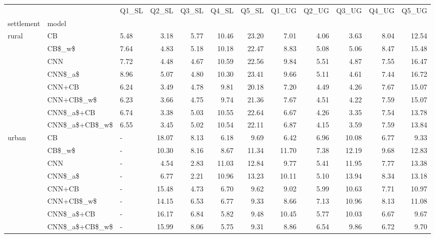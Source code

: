 \begin{tabular}{lllrrrrrrrrr}
\toprule
      &                & Q1\_SL &  Q2\_SL &  Q3\_SL &  Q4\_SL &  Q5\_SL &  Q1\_UG &  Q2\_UG &  Q3\_UG &  Q4\_UG &  Q5\_UG \\
settlement & model &       &        &        &        &        &        &        &        &        &        \\
\midrule
rural & CB &  5.48 &   3.18 &   5.77 &  10.46 &  23.20 &   7.01 &   4.06 &   3.63 &   8.04 &  12.54 \\
      & CB\$\_w\$ &  7.64 &   4.83 &   5.18 &  10.18 &  22.47 &   8.83 &   5.08 &   5.06 &   8.47 &  15.48 \\
      & CNN &  7.72 &   4.48 &   4.67 &  10.59 &  22.56 &   9.84 &   5.51 &   4.87 &   7.55 &  16.47 \\
      & CNN\$\_a\$ &  8.96 &   5.07 &   4.80 &  10.30 &  23.41 &   9.66 &   5.11 &   4.61 &   7.44 &  16.72 \\
      & CNN+CB &  6.24 &   3.49 &   4.78 &   9.81 &  20.18 &   7.20 &   4.49 &   4.26 &   7.67 &  15.07 \\
      & CNN+CB\$\_w\$ &  6.23 &   3.66 &   4.75 &   9.74 &  21.36 &   7.67 &   4.51 &   4.22 &   7.59 &  15.07 \\
      & CNN\$\_a\$+CB &  6.74 &   3.38 &   5.03 &  10.55 &  22.64 &   6.67 &   4.26 &   3.35 &   7.54 &  13.78 \\
      & CNN\$\_a\$+CB\$\_w\$ &  6.55 &   3.45 &   5.02 &  10.54 &  22.11 &   6.87 &   4.15 &   3.59 &   7.59 &  13.84 \\
urban & CB &     - &  18.07 &   8.13 &   6.18 &   9.69 &   6.42 &   6.96 &  10.08 &   6.77 &   9.33 \\
      & CB\$\_w\$ &     - &  10.30 &   8.16 &   8.67 &  11.34 &  11.70 &   7.38 &  12.19 &   9.68 &  12.83 \\
      & CNN &     - &   4.54 &   2.83 &  11.03 &  12.84 &   9.77 &   5.41 &  11.95 &   7.77 &  13.38 \\
      & CNN\$\_a\$ &     - &   6.77 &   2.21 &  10.96 &  13.23 &  10.11 &   5.10 &  13.94 &   8.34 &  13.18 \\
      & CNN+CB &     - &  15.48 &   4.73 &   6.70 &   9.62 &   9.02 &   5.99 &  10.63 &   7.71 &  10.97 \\
      & CNN+CB\$\_w\$ &     - &  14.15 &   6.53 &   6.77 &   9.33 &   8.66 &   7.13 &  10.96 &   8.13 &  11.08 \\
      & CNN\$\_a\$+CB &     - &  16.17 &   6.84 &   5.82 &   9.48 &  10.45 &   5.77 &  10.03 &   6.67 &   9.67 \\
      & CNN\$\_a\$+CB\$\_w\$ &     - &  15.99 &   8.06 &   5.75 &   9.31 &   8.86 &   6.54 &   9.86 &   6.72 &   9.70 \\
\bottomrule
\end{tabular}
